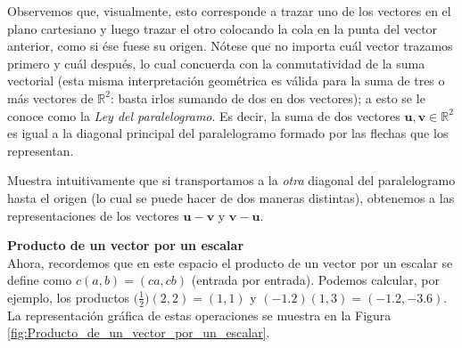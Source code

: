 \documentclass[apuntes]{subfiles}
\begin{document}
    Observemos que, visualmente, esto corresponde a trazar uno de los vectores en el plano cartesiano y luego trazar el otro colocando la cola en la punta del vector anterior, como si ése fuese su origen. Nótese que no importa cuál vector trazamos primero y cuál después, lo cual concuerda con la conmutatividad de la suma vectorial (esta misma interpretación geométrica es válida para la suma de tres o más vectores de $\mathbb{R}^2$: basta irlos sumando de dos en dos vectores); a esto se le conoce como la \emph{Ley del paralelogramo}. Es decir, la suma de dos vectores $\mathbf{u},\mathbf{v}\in\mathbb{R}^2$ es igual a la diagonal principal del paralelogramo formado por las flechas que los representan. %

\begin{ejer}
    Muestra intuitivamente que si transportamos a la \emph{otra} diagonal del paralelogramo hasta el origen (lo cual se puede hacer de dos maneras distintas), obtenemos a las representaciones de los vectores $\mathbf{u}-\mathbf{v}$ y $\mathbf{v}-\mathbf{u}$. 
\end{ejer}

\textbf{Producto de un vector por un escalar} \\

Ahora, recordemos que en este espacio el producto de un vector por un escalar se define como $c(a,b) = (ca,cb)$ (entrada por entrada). Podemos calcular, por ejemplo, los productos $\big(\frac{1}{2}\big)(2,2)=(1,1)$ y $(-1.2)(1,3)=(-1.2,-3.6)$. La representación gráfica de estas operaciones se muestra en la Figura \ref{fig:Producto_de_un_vector_por_un_escalar}.
\end{document}
